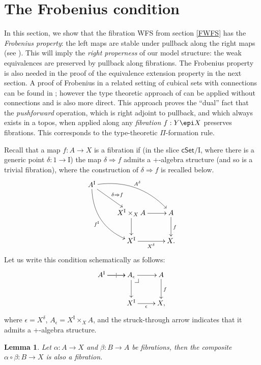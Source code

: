 \documentclass[11pt]{article}
\makeatletter
\newcommand{\cSet}{\ensuremath{\mathsf{cSet}}}
\newcommand{\pbcorner}[1][dr]{\save*!/#1-1.2pc/#1:(-1,1)@^{|-}\restore}
\newcommand{\ra}{\ensuremath{\rightarrow}}
\newcommand{\I}{\ensuremath{\mathrm{I}}}
\newtheorem{lemma}[theorem]{Lemma}
\theoremstyle{remark}
\theoremstyle{definition}
\makeatother
\begin{document}
\section{The Frobenius condition}\label{sec:Frobenius}

In this section, we show that the fibration WFS from section \ref{FWFS} has the \emph{Frobenius property}: the left maps are stable under pullback along the right maps (see \cite{vdBG}).  This will imply the \emph{right properness} of our model structure: the weak equivalences are preserved by pullback along fibrations.  The Frobenius property is also needed in the proof of the equivalence extension property in the next section.  A proof of Frobenius in a related setting of cubical sets with connections can be found in \cite{GS}; however the type theoretic approach of \cite{OP,CCHM} can be applied without connections and is also more direct.  This approach proves the ``dual'' fact that the \emph{pushforward} operation, which is right adjoint to pullback, and which always exists in a topos, when applied along any \emph{fibration} $f : Y\epi X$ preserves fibrations.  This corresponds to the type-theoretic $\Pi$-formation rule.  

Recall that a map $f:A\ra X$ is a fibration if (in the slice $\cSet/\I$, where there is a generic point $\delta : 1 \ra \I$) the map $\delta \Rightarrow f$ admits a +-algebra structure (and so is a trivial fibration), where the construction of $\delta \Rightarrow f$ is recalled below.
\begin{equation}\label{diagram:frobenius1}
\xymatrix{
A^\I \ar@/_4ex/ [rdd]_{f^\I} \ar[rd]^{\delta\Rightarrow{f}} \ar@/^4ex/ [rrd]^{A^{\delta}}  && \\
& X^\I \times_{X} A \ar[d] \ar[r] & A \ar[d]^{f} \\
& X^\I \ar[r]_{X^{\delta}} &  X.
}
\end{equation}
Let us write this condition schematically as follows:
\begin{equation}\label{diagram:frobenius1}
\xymatrix{
A^\I \ar[r]|| \ar[r]  & A_\epsilon\ar[d] \pbcorner \ar[r] & A \ar[d]^f \\
& X^\I \ar[r]_{\epsilon} &  X,
}
\end{equation}
where $\epsilon = X^{\delta}$, $A_\epsilon = X^\I \times_{X} A$, and the struck-through arrow indicates that it admits a +-algebra structure.

\begin{lemma}\label{lemma:fibrationscompose}
Let  $\alpha : A \ra X$ and $\beta: B\ra A$ be fibrations, then the composite $\alpha\circ\beta : B \ra X$ is also a fibration.
\end{lemma}
\end{document}
